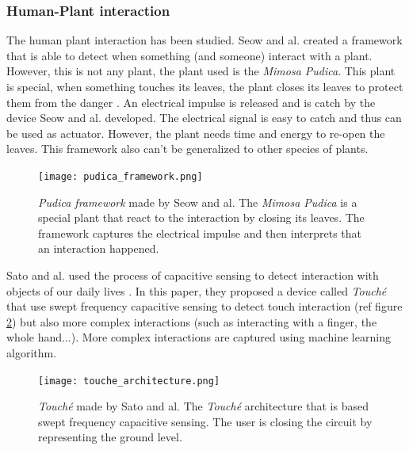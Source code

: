 \subsubsection{Human-Plant interaction}

The human plant interaction has been studied. Seow and al. \cite{seowPudicaFrameworkDesigning2022}
created a framework that is able to detect when something (and someone) interact with a plant.
However, this is not any plant, the plant used is the \textit{Mimosa Pudica}. This plant is special,
when something touches its leaves, the plant closes its leaves to protect them from the danger \cite{volkovMimosaPudicaElectrical2010}.
An electrical impulse is released and is catch by the device Seow and al. developed. The electrical
signal is easy to catch and thus can be used as actuator. However, the plant needs time and energy
to re-open the leaves. This framework also can't be generalized to other species of plants.

\begin{figure}[h!]
    \centering
    \texttt{[image: pudica\_framework.png]}
    \caption{\textit{Pudica framework} made by Seow and al. The \textit{Mimosa Pudica} is a
        special plant that react to the interaction by closing its leaves. The framework captures the electrical impulse and then interprets that an interaction happened.}
    \vspace{0.1cm}
    \label{fig:pudica_framework}
\end{figure}

Sato and al. used the process of capacitive sensing to detect interaction with objects of our daily lives \cite{satoToucheEnhancingTouch2012}.
In this paper, they proposed a device called \textit{Touché} that use swept frequency capacitive sensing to detect touch interaction (ref figure \ref{fig:touche_architecture}) but also more complex interactions (such as interacting with a finger, the whole hand...). More complex interactions are captured using machine learning algorithm.

\begin{figure}[h!]
    \centering
    \texttt{[image: touche\_architecture.png]}
    \caption{\textit{Touché} made by Sato and al. The \textit{Touché} architecture that is based swept frequency capacitive sensing. The user is closing the circuit by representing the ground level.}
    \vspace{0.1cm}
    \label{fig:touche_architecture}
\end{figure}


